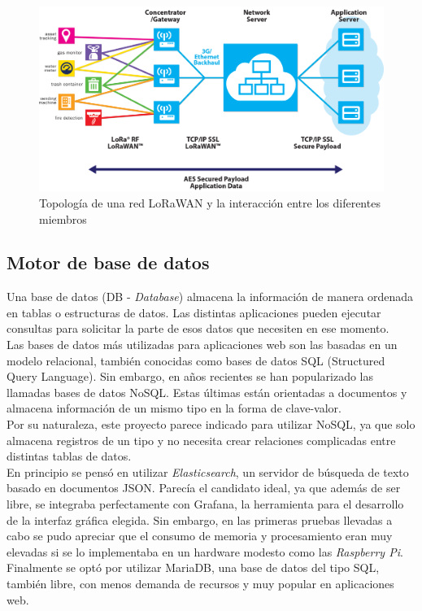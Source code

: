 \begin{figure}[h]
	\centering
	\includegraphics[width=0.9\linewidth]{Figures/sensor-gw-architecture-lora}
	\caption{Topología de una red LoRaWAN y la interacción entre los diferentes miembros}
	\label{fig:sensor-gw-architecture-lora}
\end{figure}

\subsection{Motor de base de datos}
Una base de datos (DB - \textit{Database}) almacena la información de manera ordenada en tablas o estructuras de datos. Las distintas aplicaciones pueden ejecutar consultas para solicitar la parte de esos datos que necesiten en ese momento.\\
Las bases de datos más utilizadas para aplicaciones web son las basadas en un modelo relacional, también conocidas como bases de datos SQL (Structured Query Language). Sin embargo, en años recientes se han popularizado las llamadas bases de datos NoSQL. Estas últimas están orientadas a documentos y almacena información de un mismo tipo en la forma de clave-valor.\\
Por su naturaleza, este proyecto parece indicado para utilizar NoSQL, ya que solo almacena registros de un tipo y no necesita crear relaciones complicadas entre distintas tablas de datos.\\
En principio se pensó en utilizar \textit{Elasticsearch}, un servidor de búsqueda de texto basado en documentos JSON. Parecía el candidato ideal, ya que además de ser libre, se integraba perfectamente con Grafana, la herramienta para el desarrollo de la interfaz gráfica elegida.
Sin embargo, en las primeras pruebas llevadas a cabo se pudo apreciar que el consumo de memoria y procesamiento eran muy elevadas si se lo implementaba en un hardware modesto como las \textit{Raspberry Pi}. Finalmente se optó por utilizar MariaDB, una base de datos del tipo SQL, también libre, con menos demanda de recursos y muy popular en aplicaciones web.\\

